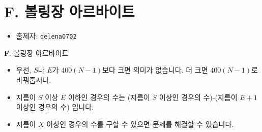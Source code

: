 \section{F. 볼링장 아르바이트}

\begin{frame} %
    \begin{itemize}
        \item 출제자: \texttt{delena0702}
    \end{itemize}
\end{frame}

\begin{frame}{\textbf{F}. 볼링장 아르바이트}
    \begin{itemize}
        \item 우선, $S$나 $E$가 $400(N-1)$보다 크면 의미가 없습니다. 더 크면 $400(N-1)$로 바꿔줍시다.
        \item 지름이 $S$ 이상 $E$ 이하인 경우의 수는 (지름이 $S$ 이상인 경우의 수)-(지름이 $E+1$ 이상인 경우의 수) 입니다.
        \item 지름이 $X$ 이상인 경우의 수를 구할 수 있으면 문제를 해결할 수 있습니다.
    \end{itemize}
\end{frame}